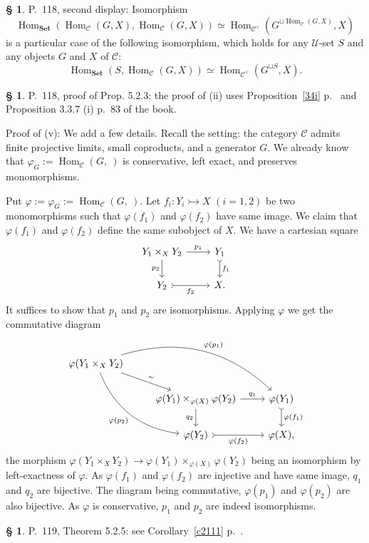 \documentclass[12pt]{article}%
\theoremstyle{remark}
\theoremstyle{definition}
\newtheorem{s}[thm]{\S}%
\newcommand{\C}{\mathcal C}
\newcommand{\U}{\mathcal U}
\newcommand{\Set}{\mathbf{Set}}%
\newcommand{\pp}{\varphi}
\newcommand{\mono}{\rightarrowtail}%
\DeclareMathOperator{\Hom}{Hom}%
\begin{document}
%

\begin{s}
P.~118, second display: Isomorphism 
$$
\Hom_{\Set}(\Hom_\C(G,X),\Hom_\C(G,X))\simeq\Hom_{\C^\vee}(G^{\sqcup\Hom_\C(G,X)},X)
$$ 
is a particular case of the following isomorphism, which holds for any $\U$-set $S$ and any objects $G$ and $X$ of $\C$: 
$$
\Hom_{\Set}(S,\Hom_\C(G,X))\simeq\Hom_{\C^\vee}(G^{\sqcup S},X).
$$ 
\end{s}

%

\begin{s}
P.~118, proof of Prop. 5.2.3: the proof of (ii) uses Proposition~\ref{34i} p.~\pageref{34i} and Proposition 3.3.7 (i) p.~83 of the book. 

Proof of (v): We add a few details. Recall the setting: the category $\C$ admits finite projective limits, small coproducts, and a generator $G$. We already know that $\pp_G:=\Hom_\C(G,\ )$ is conservative, left exact, and preserves monomorphisms. 

Put $\pp:=\pp_G:=\Hom_\C(G,\ )$. Let $f_i:Y_i\mono X$ $(i=1,2)$ be two monomorphisms such that $\pp(f_1)$ and $\pp(f_2)$ have same image. We claim that $\pp(f_1)$ and $\pp(f_2)$ define the same subobject of $X$. We have a cartesian square
$$
\begin{tikzcd}
Y_1\times_XY_2\ar{r}{p_1}\ar{d}[swap]{p_2}&Y_1\ar[tail]{d}{f_1}\\ 
Y_2\ar[tail]{r}[swap]{f_2}&X.
\end{tikzcd}
$$ 
It suffices to show that $p_1$ and $p_2$ are isomorphisms. Applying $\pp$ we get the commutative diagram 
$$
\begin{tikzcd}
\pp(Y_1\times_XY_2)\ar{rd}{\sim}\ar[bend left]{rrd}{\pp(p_1)}\ar[bend right]{rdd}[swap]{\pp(p_2)}\\ 
{}&\pp(Y_1)\times_{\pp(X)}\pp(Y_2)\ar{r}{q_1}\ar{d}[swap]{q_2}&\pp(Y_1)\ar[tail]{d}{\pp(f_1)}\\ 
{}&\pp(Y_2)\ar[tail]{r}[swap]{\pp(f_2)}&\pp(X),
\end{tikzcd}
$$ 
the morphism $\pp(Y_1\times_XY_2)\to\pp(Y_1)\times_{\pp(X)}\pp(Y_2)$ being an isomorphism by left-exactness of $\pp$. As $\pp(f_1)$ and $\pp(f_2)$ are injective and have same image, $q_1$ and $q_2$ are bijective. The diagram being commutative, $\pp(p_1)$ and $\pp(p_2)$ are also bijective. As $\pp$ is conservative,  $p_1$ and $p_2$ are indeed isomorphisms.
\end{s}

%

\begin{s}
P.~119, Theorem 5.2.5: see Corollary~\ref{c2111} p.~\pageref{c2111}.
\end{s}
\end{document}
